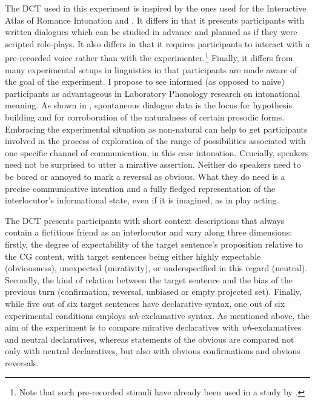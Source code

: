 The \ac{DCT} used in this experiment is inspired by the ones used for the Interactive Atlas of Romance Intonation and \citet{Frota2015romance}. It differs in that it presents participants with written dialogues which can be studied in advance and planned as if they were scripted role-plays. It also differs in that it requires participants to interact with a pre-recorded voice rather than with the experimenter.\footnote{Note that such pre-recorded stimuli have already been used in a study by \citet[78]{Face2002}.} Finally, it differs from many experimental setups in linguistics in that participants are made aware of the goal of the experiment. I propose to see informed (as opposed to naive) participants as advantageous in Laboratory Phonology research on intonational meaning. As shown in , spontaneous dialogue data is the locus for hypothesis building and for corroboration of the naturalness of certain prosodic forms. Embracing the experimental situation as non-natural can help to get participants involved in the process of exploration of the range of possibilities associated with one specific channel of communication, in this case intonation. Crucially, speakers need not be surprised to utter a mirative assertion. Neither do speakers need to be bored or annoyed to mark a reversal as obvious. What they do need is a precise communicative intention and a fully fledged representation of the interlocutor's informational state, even if it is imagined, as in play acting.

The \ac{DCT} presents participants with short context descriptions that always contain a fictitious friend as an interlocutor and vary along three dimensions: firstly, the degree of expectability of the target sentence's proposition relative to the \ac{CG} content, with target sentences being either highly expectable (obviousness), unexpected (mirativity), or underspecified in this regard (neutral). Secondly, the kind of relation between the target sentence and the bias of the previous turn (confirmation, reversal, unbiased or empty projected set). Finally, while five out of six target sentences have declarative syntax, one out of six experimental conditions employs \textit{wh}-exclamative syntax. As mentioned above, the aim of the experiment is to compare mirative declaratives with \textit{wh}-exclamatives and neutral declaratives, whereas statements of the obvious are compared not only with neutral declaratives, but also with obvious confirmations and obvious reversals.\largerpage

